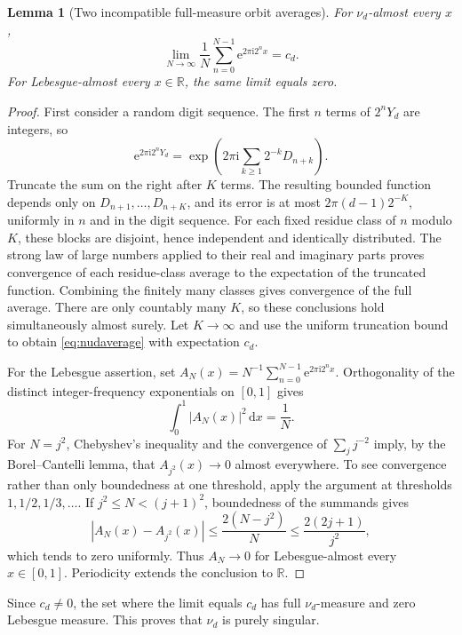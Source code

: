 \documentclass[11pt,letterpaper]{article}
\numberwithin{equation}{section}
\newtheorem{lemma}[theorem]{Lemma}
\theoremstyle{definition}
\theoremstyle{remark}
\newcommand{\R}{\mathbb R}
\newcommand{\dd}{\,\mathrm d}
\newcommand{\ii}{\mathrm i}
\newcommand{\e}{\mathrm e}
\begin{document}
\begin{lemma}[Two incompatible full-measure orbit averages]
For \(\nu_d\)-almost every \(x\),
\begin{equation}
 \lim_{N\to\infty}\frac1N\sum_{n=0}^{N-1}\e^{2\pi\ii2^nx}=c_d.
 \label{eq:nudaverage}
\end{equation}
For Lebesgue-almost every \(x\in\R\), the same limit equals zero.
\end{lemma}
\begin{proof}
First consider a random digit sequence. The first \(n\) terms of \(2^nY_d\) are integers, so
\[
 \e^{2\pi\ii2^nY_d}
 =\exp\left(2\pi\ii\sum_{k\geq1}2^{-k}D_{n+k}\right).
\]
Truncate the sum on the right after \(K\) terms. The resulting bounded function depends only on \(D_{n+1},\ldots,D_{n+K}\), and its error is at most \(2\pi(d-1)2^{-K}\), uniformly in \(n\) and in the digit sequence. For each fixed residue class of \(n\) modulo \(K\), these blocks are disjoint, hence independent and identically distributed. The strong law of large numbers applied to their real and imaginary parts proves convergence of each residue-class average to the expectation of the truncated function. Combining the finitely many classes gives convergence of the full average. There are only countably many \(K\), so these conclusions hold simultaneously almost surely. Let \(K\to\infty\) and use the uniform truncation bound to obtain \eqref{eq:nudaverage} with expectation \(c_d\).

For the Lebesgue assertion, set
\(A_N(x)=N^{-1}\sum_{n=0}^{N-1}\e^{2\pi\ii2^nx}\).
Orthogonality of the distinct integer-frequency exponentials on \([0,1]\) gives
\[
 \int_0^1|A_N(x)|^2\dd x=\frac1N.
\]
For \(N=j^2\), Chebyshev's inequality and the convergence of \(\sum_jj^{-2}\) imply, by the Borel--Cantelli lemma, that \(A_{j^2}(x)\to0\) almost everywhere. To see convergence rather than only boundedness at one threshold, apply the argument at thresholds \(1,1/2,1/3,\ldots\). If \(j^2\leq N<(j+1)^2\), boundedness of the summands gives
\[
 |A_N(x)-A_{j^2}(x)|\leq\frac{2(N-j^2)}N\leq\frac{2(2j+1)}{j^2},
\]
which tends to zero uniformly. Thus \(A_N\to0\) for Lebesgue-almost every \(x\in[0,1]\). Periodicity extends the conclusion to \(\R\).
\end{proof}

Since \(c_d\ne0\), the set where the limit equals \(c_d\) has full \(\nu_d\)-measure and zero Lebesgue measure. This proves that \(\nu_d\) is purely singular.
\end{document}
